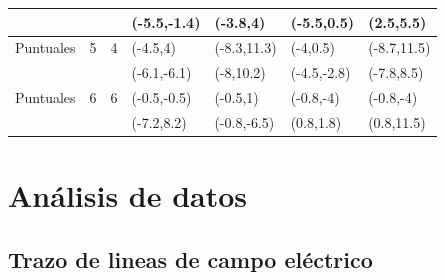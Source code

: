 \documentclass[letterpaper, 12pt]{report}
\begin{document}
\begin{table}[H]
\begin{center}
\begin{tabular}{|p{2.5cm}|p{1.3cm}|p{2cm}|p{1.9cm}|p{1.9cm}|p{1.9cm}|p{1.9cm}|}
			             &
			             &
			             &
			(-5.5,-1.4)  &
			(-3.8,4)     &
			(-5.5,0.5)   &
			(2.5,5.5)                                                                          \\ \hline


			Puntuales    & 5     & 4                & (-4.5,4)    & (-8.3,11.3) & (-4,0.5)   &
			(-8.7,11.5)                                                                        \\

			             &
			             &
			             &
			(-6.1,-6.1)  &
			(-8,10.2)    &
			(-4.5,-2.8)  &
			(-7.8,8.5)                                                                         \\ \hline


			Puntuales    & 6     & 6                & (-0.5,-0.5) & (-0.5,1)    & (-0.8,-4)  &
			(-0.8,-4)                                                                          \\

			             &
			             &
			             &
			(-7.2,8.2)   &
			(-0.8,-6.5)  &
			(0.8,1.8)    &
			(0.8,11.5)                                                                         \\ \hline
		\end{tabular}

	\end{center}
\end{table}

\section{Análisis de datos}

\subsection{Trazo de lineas de campo eléctrico}
\end{document}
